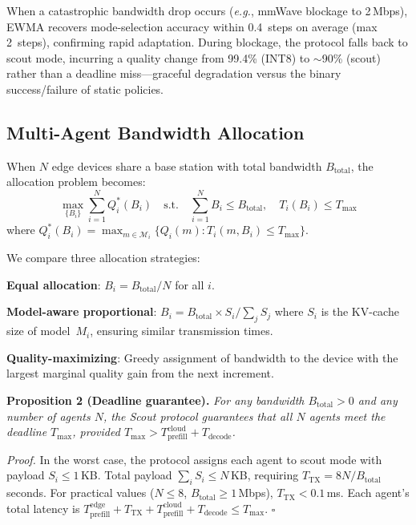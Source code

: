 \documentclass[journal]{IEEEtran}
\newcommand{\eg}{\textit{e.g.}\xspace}
\begin{document}
When a catastrophic bandwidth drop occurs (\eg, mmWave blockage to 2\,Mbps), EWMA recovers mode-selection accuracy within 0.4~steps on average (max 2~steps), confirming rapid adaptation.
During blockage, the protocol falls back to scout mode, incurring a quality change from 99.4\% (INT8) to $\sim$90\% (scout) rather than a deadline miss---graceful degradation versus the binary success/failure of static policies.

\subsection{Multi-Agent Bandwidth Allocation}

When $N$ edge devices share a base station with total bandwidth $B_{\text{total}}$, the allocation problem becomes:
\begin{equation}
    \max_{\{B_i\}} \sum_{i=1}^{N} Q_i^*(B_i)
    \quad \text{s.t.} \quad \sum_{i=1}^{N} B_i \leq B_{\text{total}}, \quad T_i(B_i) \leq T_{\max}
    \label{eq:multiagent}
\end{equation}
where $Q_i^*(B_i) = \max_{m \in \mathcal{M}_i} \{Q_i(m) : T_i(m, B_i) \leq T_{\max}\}$.

We compare three allocation strategies:

\textbf{Equal allocation}: $B_i = B_{\text{total}} / N$ for all $i$.

\textbf{Model-aware proportional}: $B_i = B_{\text{total}} \times S_i / \sum_j S_j$ where $S_i$ is the KV-cache size of model~$M_i$, ensuring similar transmission times.

\textbf{Quality-maximizing}: Greedy assignment of bandwidth to the device with the largest marginal quality gain from the next increment.

\textbf{Proposition 2 (Deadline guarantee).}
\emph{For any bandwidth $B_{\text{total}} > 0$ and any number of agents $N$, the Scout protocol guarantees that all $N$ agents meet the deadline $T_{\max}$, provided $T_{\max} > T_{\text{prefill}}^{\text{cloud}} + T_{\text{decode}}$.}

\emph{Proof.}
In the worst case, the protocol assigns each agent to scout mode with payload $S_i \leq 1$\,KB.
Total payload $\sum_i S_i \leq N$\,KB, requiring $T_{\text{TX}} = 8N / B_{\text{total}}$\,seconds.
For practical values ($N \leq 8$, $B_{\text{total}} \geq 1$\,Mbps), $T_{\text{TX}} < 0.1$\,ms.
Each agent's total latency is $T_{\text{prefill}}^{\text{edge}} + T_{\text{TX}} + T_{\text{prefill}}^{\text{cloud}} + T_{\text{decode}} \leq T_{\max}$.
\hfill$\square$
\end{document}
